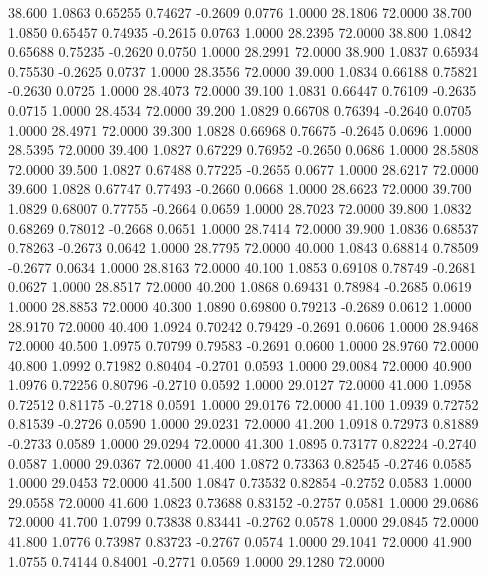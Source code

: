   38.600   1.0863   0.65255   0.74627  -0.2609   0.0776   1.0000  28.1806  72.0000
  38.700   1.0850   0.65457   0.74935  -0.2615   0.0763   1.0000  28.2395  72.0000
  38.800   1.0842   0.65688   0.75235  -0.2620   0.0750   1.0000  28.2991  72.0000
  38.900   1.0837   0.65934   0.75530  -0.2625   0.0737   1.0000  28.3556  72.0000
  39.000   1.0834   0.66188   0.75821  -0.2630   0.0725   1.0000  28.4073  72.0000
  39.100   1.0831   0.66447   0.76109  -0.2635   0.0715   1.0000  28.4534  72.0000
  39.200   1.0829   0.66708   0.76394  -0.2640   0.0705   1.0000  28.4971  72.0000
  39.300   1.0828   0.66968   0.76675  -0.2645   0.0696   1.0000  28.5395  72.0000
  39.400   1.0827   0.67229   0.76952  -0.2650   0.0686   1.0000  28.5808  72.0000
  39.500   1.0827   0.67488   0.77225  -0.2655   0.0677   1.0000  28.6217  72.0000
  39.600   1.0828   0.67747   0.77493  -0.2660   0.0668   1.0000  28.6623  72.0000
  39.700   1.0829   0.68007   0.77755  -0.2664   0.0659   1.0000  28.7023  72.0000
  39.800   1.0832   0.68269   0.78012  -0.2668   0.0651   1.0000  28.7414  72.0000
  39.900   1.0836   0.68537   0.78263  -0.2673   0.0642   1.0000  28.7795  72.0000
  40.000   1.0843   0.68814   0.78509  -0.2677   0.0634   1.0000  28.8163  72.0000
  40.100   1.0853   0.69108   0.78749  -0.2681   0.0627   1.0000  28.8517  72.0000
  40.200   1.0868   0.69431   0.78984  -0.2685   0.0619   1.0000  28.8853  72.0000
  40.300   1.0890   0.69800   0.79213  -0.2689   0.0612   1.0000  28.9170  72.0000
  40.400   1.0924   0.70242   0.79429  -0.2691   0.0606   1.0000  28.9468  72.0000
  40.500   1.0975   0.70799   0.79583  -0.2691   0.0600   1.0000  28.9760  72.0000
  40.800   1.0992   0.71982   0.80404  -0.2701   0.0593   1.0000  29.0084  72.0000
  40.900   1.0976   0.72256   0.80796  -0.2710   0.0592   1.0000  29.0127  72.0000
  41.000   1.0958   0.72512   0.81175  -0.2718   0.0591   1.0000  29.0176  72.0000
  41.100   1.0939   0.72752   0.81539  -0.2726   0.0590   1.0000  29.0231  72.0000
  41.200   1.0918   0.72973   0.81889  -0.2733   0.0589   1.0000  29.0294  72.0000
  41.300   1.0895   0.73177   0.82224  -0.2740   0.0587   1.0000  29.0367  72.0000
  41.400   1.0872   0.73363   0.82545  -0.2746   0.0585   1.0000  29.0453  72.0000
  41.500   1.0847   0.73532   0.82854  -0.2752   0.0583   1.0000  29.0558  72.0000
  41.600   1.0823   0.73688   0.83152  -0.2757   0.0581   1.0000  29.0686  72.0000
  41.700   1.0799   0.73838   0.83441  -0.2762   0.0578   1.0000  29.0845  72.0000
  41.800   1.0776   0.73987   0.83723  -0.2767   0.0574   1.0000  29.1041  72.0000
  41.900   1.0755   0.74144   0.84001  -0.2771   0.0569   1.0000  29.1280  72.0000
